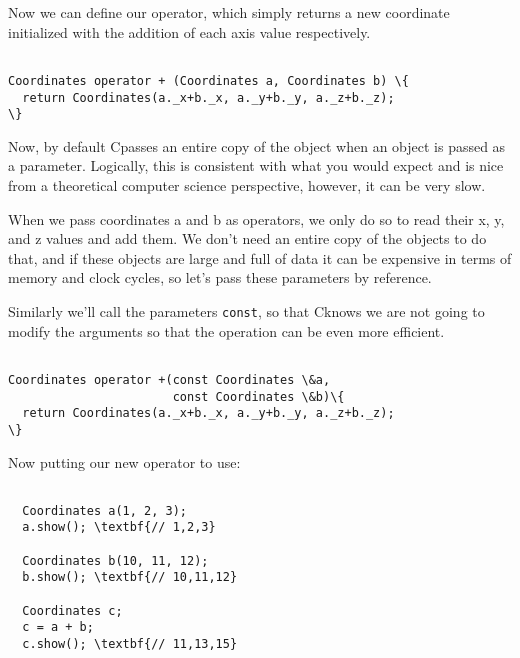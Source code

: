 \documentclass{IEEEtran}
\newcommand{\cpp}{C\nolinebreak\hspace{-.05em}\raisebox{.15ex}{\small\bf +}\nolinebreak\hspace{-.10em}\raisebox{.15ex}{\small\bf+\ }}
\begin{document}
Now we can define our operator, which simply returns a new coordinate initialized with the addition of each axis value respectively.

\begin{Verbatim}[fontsize=\scriptsize, xleftmargin=.3in, commandchars=\\\{\}]

Coordinates operator + (Coordinates a, Coordinates b) \{
  return Coordinates(a._x+b._x, a._y+b._y, a._z+b._z);
\}

\end{Verbatim}

Now, by default \cpp passes an entire copy of the object when an object is passed as a parameter. Logically, this is consistent with what you would expect and is nice from a theoretical computer science perspective, however, it can be very slow. 

When we pass coordinates a and b as operators, we only do so to read their x, y, and z values and add them. We don't need an entire copy of the objects to do that, and if these objects are large and full of data it can be expensive in terms of memory and clock cycles, so let's pass these parameters by reference.

Similarly we'll call the parameters \verb|const|, so that \cpp knows we are not going to modify the arguments so that the operation can be even more efficient.

\begin{Verbatim}[fontsize=\scriptsize, xleftmargin=.3in, commandchars=\\\{\}]

Coordinates operator +(const Coordinates \&a, 
                       const Coordinates \&b)\{
  return Coordinates(a._x+b._x, a._y+b._y, a._z+b._z);
\}

\end{Verbatim}

Now putting our new operator to use:

\begin{Verbatim}[fontsize=\scriptsize, xleftmargin=.3in, commandchars=\\\{\}]

  Coordinates a(1, 2, 3);
  a.show(); \textbf{// 1,2,3}

  Coordinates b(10, 11, 12);
  b.show(); \textbf{// 10,11,12}

  Coordinates c;
  c = a + b;
  c.show(); \textbf{// 11,13,15}

\end{Verbatim}
\end{document}
